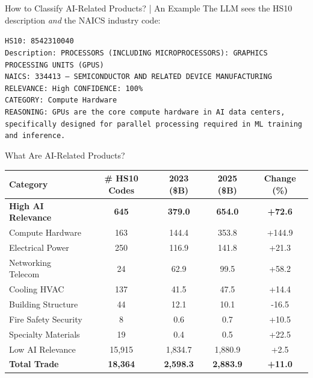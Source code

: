 \documentclass[10pt,pdftex,aspectratio=169]{beamer}
\theoremstyle{definition}
\begin{document}

\begin{frame}[t]{How to Classify AI-Related Products? | An Example}
The LLM sees the HS10 description \emph{and} the NAICS industry code:\\
{\tiny
\begin{tcolorbox}[colback=gray!5!white, colframe=gray!50!white, boxrule=0.5pt, top=3mm, bottom=3mm, left=3mm, right=3mm]
{\small
\texttt{HS10: 8542310040}\\
\texttt{Description: PROCESSORS (INCLUDING MICROPROCESSORS): GRAPHICS PROCESSING UNITS (GPUS)}\\
\texttt{NAICS: 334413 --- SEMICONDUCTOR AND RELATED DEVICE MANUFACTURING}\\[6pt]
\texttt{RELEVANCE: High \quad CONFIDENCE: 100\%}\\
\texttt{CATEGORY: Compute Hardware}\\
\texttt{REASONING: GPUs are the core compute hardware in AI data centers, specifically designed for parallel processing required in ML training and inference.}
}
\end{tcolorbox}}
\end{frame}


\begin{frame}[t]{What Are AI-Related Products?}
\smallskip
\begin{table}[t]
\centering
\setlength{\tabcolsep}{2.25mm}
\renewcommand{\arraystretch}{1.0}
\begin{tabular}{lcccc}
\toprule
Category & \# HS10 Codes & 2023 (\$B) & 2025 (\$B) & Change (\%) \\
\midrule
\textbf{High AI Relevance} & \textbf{645} & \textbf{379.0} & \textbf{654.0} & \textbf{+72.6} \\
\quad Compute Hardware & 163 & 144.4 & 353.8 & +144.9 \\
\quad Electrical Power & 250 & 116.9 & 141.8 & +21.3 \\
\quad Networking Telecom & 24 & 62.9 & 99.5 & +58.2 \\
\quad Cooling HVAC & 137 & 41.5 & 47.5 & +14.4 \\
\quad Building Structure & 44 & 12.1 & 10.1 & -16.5 \\
\quad Fire Safety Security & 8 & 0.6 & 0.7 & +10.5 \\
\quad Specialty Materials & 19 & 0.4 & 0.5 & +22.5 \\
\midrule
Low AI Relevance & 15,915 & 1,834.7 & 1,880.9 & +2.5 \\
\midrule
\textbf{Total Trade} & \textbf{18,364} & \textbf{2,598.3} & \textbf{2,883.9} & \textbf{+11.0} \\
\bottomrule
\end{tabular}
\end{table}
\end{frame}
\end{document}
